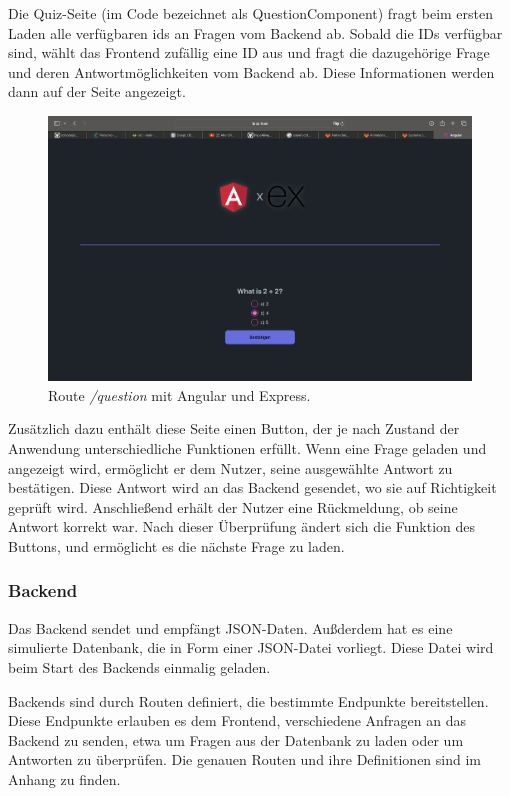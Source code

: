 \documentclass[biblatex]{lni}
\begin{document}
Die Quiz-Seite (im Code bezeichnet als QuestionComponent) fragt beim ersten Laden alle verfügbaren ids an Fragen vom Backend ab.
Sobald die IDs verfügbar sind,
wählt das Frontend zufällig eine ID aus und fragt die dazugehörige Frage und deren Antwortmöglichkeiten vom Backend ab.
Diese Informationen werden dann auf der Seite angezeigt.

\begin{figure}
  \centering
  \includegraphics[width=.8\textwidth]{question-component}
  \caption{Route \textit{/question} mit Angular und Express.}
  \label{fig:question-component}
\end{figure}

Zusätzlich dazu enthält diese Seite einen Button,
der je nach Zustand der Anwendung unterschiedliche Funktionen erfüllt.
Wenn eine Frage geladen und angezeigt wird, ermöglicht er dem Nutzer,
seine ausgewählte Antwort zu bestätigen.
Diese Antwort wird an das Backend gesendet, wo sie auf Richtigkeit geprüft wird.
Anschließend erhält der Nutzer eine Rückmeldung, ob seine Antwort korrekt war.
Nach dieser Überprüfung ändert sich die Funktion des Buttons, und ermöglicht es die nächste Frage zu laden.

\subsubsection{Backend}

Das Backend sendet und empfängt JSON-Daten.
Außderdem hat es eine simulierte Datenbank, die in Form einer JSON-Datei vorliegt.
Diese Datei wird beim Start des Backends einmalig geladen.

Backends sind durch Routen definiert, die bestimmte Endpunkte bereitstellen.
Diese Endpunkte erlauben es dem Frontend, verschiedene Anfragen an das Backend zu senden, etwa um Fragen aus der Datenbank zu laden oder um Antworten zu überprüfen.
Die genauen Routen und ihre Definitionen sind im Anhang zu finden.
\end{document}
